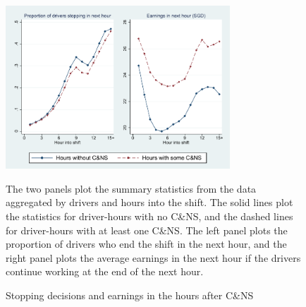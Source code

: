 \documentclass[reviewmode,AEJ]{AEA}
\begin{document}
\begin{figure}
	{\centering
		\caption{Stopping decisions and earnings in the hours after C\&NS} %
		\includegraphics[width=0.75\textwidth]{./fg/modelfreecumhours.pdf}
		\label{fg:quitbyhour}
	}
	\begin{figurenotes}
	\small The two panels plot the summary statistics from the data aggregated by drivers and hours into the shift. The solid lines plot the statistics for driver-hours with no C\&NS, and the dashed lines for driver-hours with at least one C\&NS. The left panel plots the proportion of drivers who end the shift in the next hour, and the right panel plots the average earnings in the next hour if the drivers continue working at the end of the next hour.
	\end{figurenotes}

\end{figure}
\end{document}
